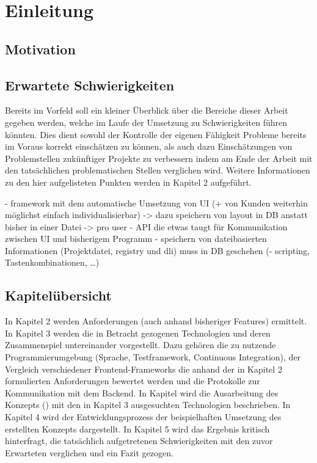\chapter{Einleitung}

\section{Motivation}

\section{Erwartete Schwierigkeiten}
Bereits im Vorfeld soll ein kleiner Überblick über die Bereiche dieser Arbeit gegeben werden, welche im Laufe der Umsetzung zu Schwierigkeiten führen könnten. Dies dient sowohl der Kontrolle der eigenen Fähigkeit Probleme bereits im Voraus korrekt einschätzen zu können, als auch dazu Einschätzungen von Problemstellen zukünftiger Projekte zu verbessern indem am Ende der Arbeit mit den tatsächlichen problematischen Stellen verglichen wird. Weitere Informationen zu den hier aufgelisteten Punkten werden in Kapitel 2  aufgeführt.

- framework mit dem automatische Umsetzung von UI (+ von Kunden weiterhin möglichst einfach individualisierbar)
    -> dazu speichern von layout in DB anstatt bisher in einer Datei -> pro user
- API die etwas taugt für Kommunikation zwischen UI und bisherigem Programm
- speichern von dateibasierten Informationen (Projektdatei, registry und dli) muss in DB geschehen
(- scripting, Tastenkombinationen, \ldots) 

\section{Kapitelübersicht}
In Kapitel 2  werden Anforderungen (auch anhand bisheriger Features) ermittelt.
In Kapitel 3  werden die in Betracht gezogenen Technologien und deren Zusammenspiel untereinander vorgestellt. Dazu gehören die zu nutzende Programmierumgebung (Sprache, Testframework, Continuous Integration), der Vergleich verschiedener Frontend-Frameworks die anhand der in Kapitel 2  formulierten Anforderungen bewertet werden und die Protokolle  zur Kommunikation mit dem Backend.
In Kapitel  wird die Ausarbeitung des Konzepts () mit den in Kapitel 3  ausgesuchten Technologien beschrieben.
In Kapitel 4  wird der Entwicklungsprozess der beispielhaften Umsetzung des erstellten Konzepts dargestellt.
In Kapitel 5  wird das Ergebnis kritisch hinterfragt, die tatsächlich aufgetretenen Schwierigkeiten mit den zuvor Erwarteten verglichen und ein Fazit gezogen.
